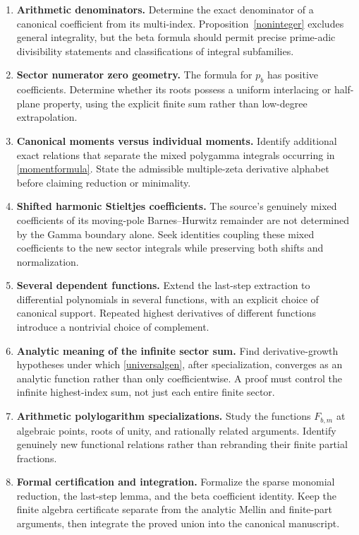 \documentclass[11pt]{article}
\numberwithin{equation}{section}
\theoremstyle{definition}\newtheorem{definition}[theorem]{Definition}
\theoremstyle{remark}\newtheorem{remark}[theorem]{Remark}
\begin{document}
\begin{enumerate}
\item \textbf{Arithmetic denominators.} Determine the exact denominator of a canonical coefficient from its multi-index. Proposition~\ref{noninteger} excludes general integrality, but the beta formula should permit precise prime-adic divisibility statements and classifications of integral subfamilies.
\item \textbf{Sector numerator zero geometry.} The formula for $p_b$ has positive coefficients. Determine whether its roots possess a uniform interlacing or half-plane property, using the explicit finite sum rather than low-degree extrapolation.
\item \textbf{Canonical moments versus individual moments.} Identify additional exact relations that separate the mixed polygamma integrals occurring in \eqref{momentformula}. State the admissible multiple-zeta derivative alphabet before claiming reduction or minimality.
\item \textbf{Shifted harmonic Stieltjes coefficients.} The source's genuinely mixed coefficients of its moving-pole Barnes--Hurwitz remainder are not determined by the Gamma boundary alone. Seek identities coupling these mixed coefficients to the new sector integrals while preserving both shifts and normalization.
\item \textbf{Several dependent functions.} Extend the last-step extraction to differential polynomials in several functions, with an explicit choice of canonical support. Repeated highest derivatives of different functions introduce a nontrivial choice of complement.
\item \textbf{Analytic meaning of the infinite sector sum.} Find derivative-growth hypotheses under which \eqref{universalgen}, after specialization, converges as an analytic function rather than only coefficientwise. A proof must control the infinite highest-index sum, not just each entire finite sector.
\item \textbf{Arithmetic polylogarithm specializations.} Study the functions $F_{b,m}$ at algebraic points, roots of unity, and rationally related arguments. Identify genuinely new functional relations rather than rebranding their finite partial fractions.
\item \textbf{Formal certification and integration.} Formalize the sparse monomial reduction, the last-step lemma, and the beta coefficient identity. Keep the finite algebra certificate separate from the analytic Mellin and finite-part arguments, then integrate the proved union into the canonical manuscript.
\end{enumerate}
\end{document}
